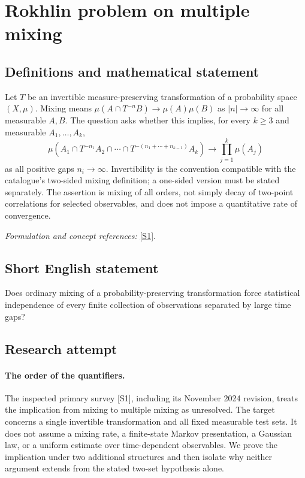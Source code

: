 \documentclass[11pt]{article}
\begin{document}
\section*{\texorpdfstring{Rokhlin problem on multiple mixing}{Rokhlin problem on multiple mixing}}\label{396}
\subsection{Definitions and mathematical statement}
Let $T$ be an invertible measure-preserving transformation of a probability space $(X,\mu)$. Mixing means $\mu(A\cap T^{-n}B)\to\mu(A)\mu(B)$ as $|n|\to\infty$ for all measurable $A,B$. The question asks whether this implies, for every $k\ge3$ and measurable $A_1,\ldots,A_k$,
\[
 \mu\!\left(A_1\cap T^{-n_1}A_2\cap\cdots\cap
 T^{-(n_1+\cdots+n_{k-1})}A_k\right)
 \longrightarrow\prod_{j=1}^k\mu(A_j)
\]
as all positive gaps $n_i\to\infty$. Invertibility is the convention compatible with the catalogue's two-sided mixing definition; a one-sided version must be stated separately. The assertion is mixing of all orders, not simply decay of two-point correlations for selected observables, and does not impose a quantitative rate of convergence.
\par\smallskip\textit{Formulation and concept references:} \href{https://arxiv.org/abs/2411.07234}{[S1]}.

\subsection{Short English statement}
Does ordinary mixing of a probability-preserving transformation force statistical independence of every finite collection of observations separated by large time gaps?
\subsection{Research attempt}
\paragraph{The order of the quantifiers.}
The inspected primary survey [S1], including its November 2024
revision, treats the implication from mixing to multiple mixing as
unresolved. The target concerns a single invertible transformation
and all fixed measurable test sets. It does not assume a mixing rate,
a finite-state Markov presentation, a Gaussian law, or a uniform
estimate over time-dependent observables. We prove the implication
under two additional structures and then isolate why neither argument
extends from the stated two-set hypothesis alone.
\end{document}
